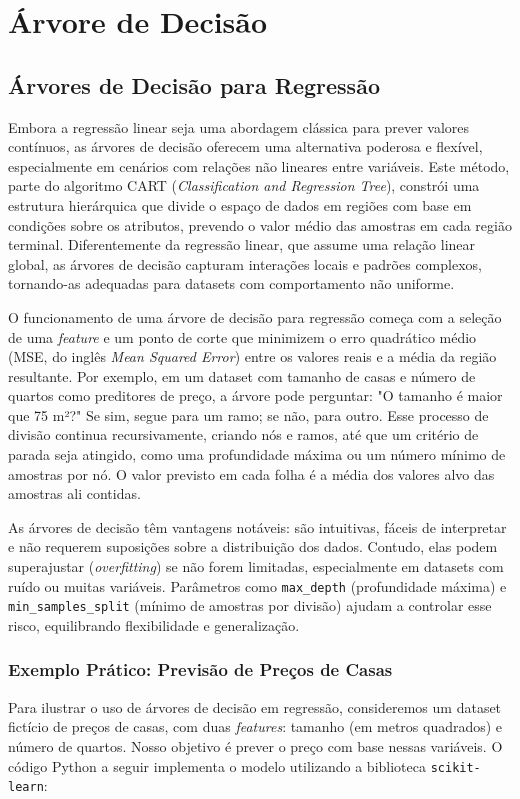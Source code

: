 \documentclass[a4paper,12pt,openany]{book}
\begin{document}
\section{Árvore de Decisão}\label{sec:arvore}
\subsection{Árvores de Decisão para Regressão}

Embora a regressão linear seja uma abordagem clássica para prever valores contínuos, as árvores de decisão oferecem uma alternativa poderosa e flexível, especialmente em cenários com relações não lineares entre variáveis. Este método, parte do algoritmo CART (\textit{Classification and Regression Tree}), constrói uma estrutura hierárquica que divide o espaço de dados em regiões com base em condições sobre os atributos, prevendo o valor médio das amostras em cada região terminal. Diferentemente da regressão linear, que assume uma relação linear global, as árvores de decisão capturam interações locais e padrões complexos, tornando-as adequadas para datasets com comportamento não uniforme.

O funcionamento de uma árvore de decisão para regressão começa com a seleção de uma \textit{feature} e um ponto de corte que minimizem o erro quadrático médio (MSE, do inglês \textit{Mean Squared Error}) entre os valores reais e a média da região resultante. Por exemplo, em um dataset com tamanho de casas e número de quartos como preditores de preço, a árvore pode perguntar: "O tamanho é maior que 75 m²?" Se sim, segue para um ramo; se não, para outro. Esse processo de divisão continua recursivamente, criando nós e ramos, até que um critério de parada seja atingido, como uma profundidade máxima ou um número mínimo de amostras por nó. O valor previsto em cada folha é a média dos valores alvo das amostras ali contidas.

As árvores de decisão têm vantagens notáveis: são intuitivas, fáceis de interpretar e não requerem suposições sobre a distribuição dos dados. Contudo, elas podem superajustar (\textit{overfitting}) se não forem limitadas, especialmente em datasets com ruído ou muitas variáveis. Parâmetros como \texttt{max\_depth} (profundidade máxima) e \texttt{min\_samples\_split} (mínimo de amostras por divisão) ajudam a controlar esse risco, equilibrando flexibilidade e generalização.

\subsubsection{Exemplo Prático: Previsão de Preços de Casas}
Para ilustrar o uso de árvores de decisão em regressão, consideremos um dataset fictício de preços de casas, com duas \textit{features}: tamanho (em metros quadrados) e número de quartos. Nosso objetivo é prever o preço com base nessas variáveis. O código Python a seguir implementa o modelo utilizando a biblioteca \texttt{scikit-learn}:
\end{document}

